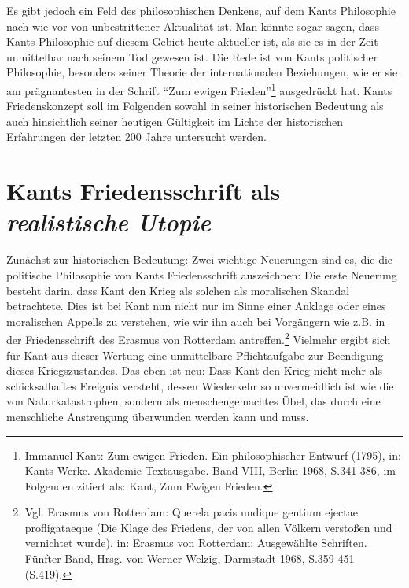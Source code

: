 \documentclass[12pt,a4paper,ngerman]{article}
\begin{document}
Es gibt jedoch ein Feld des philosophischen Denkens, auf dem Kants
Philosophie nach wie vor von unbestrittener Aktualität ist. Man könnte
sogar sagen, dass Kants Philosophie auf diesem Gebiet heute aktueller
ist, als sie es in der Zeit unmittelbar nach seinem Tod gewesen
ist. Die Rede ist von Kants politischer Philosophie, besonders seiner
Theorie der internationalen Beziehungen, wie er sie am prägnantesten
in der Schrift "`Zum ewigen Frieden"'\footnote{Immanuel Kant: Zum
ewigen Frieden. Ein philosophischer Entwurf (1795), in: Kants
Werke. Akademie-Textausgabe. Band VIII, Berlin 1968,
S.341-386, im Folgenden zitiert als: Kant, Zum Ewigen Frieden.}
ausgedrückt hat. Kants Friedenskonzept soll im Folgenden sowohl in
seiner historischen Bedeutung als auch hinsichtlich seiner heutigen
Gültigkeit im Lichte der historischen Erfahrungen der letzten 200
Jahre untersucht werden.

\section{Kants Friedensschrift als {\em realistische Utopie}}

Zunächst zur historischen Bedeutung: Zwei wichtige Neuerungen sind es,
die die politische Philosophie von Kants Friedensschrift auszeichnen:
Die erste Neuerung besteht darin, dass Kant den Krieg als solchen als
moralischen Skandal betrachtete. Dies ist bei Kant nun nicht nur im
Sinne einer Anklage oder eines moralischen Appells zu verstehen, wie
wir ihn auch bei Vorgängern wie z.B. in der Friedensschrift des
Erasmus von Rotterdam antreffen.\footnote{Vgl. Erasmus von Rotterdam:
  Querela pacis undique gentium ejectae profligataeque (Die Klage des
  Friedens, der von allen Völkern verstoßen und vernichtet wurde), in:
  Erasmus von Rotterdam: Ausgewählte Schriften. Fünfter Band, Hrsg.
  von Werner Welzig, Darmstadt 1968, S.359-451 (S.419).} Vielmehr
ergibt sich für Kant aus dieser Wertung eine unmittelbare
Pflichtaufgabe zur Beendigung dieses Kriegszustandes.  Das eben ist
neu: Dass Kant den Krieg nicht mehr als schicksalhaftes Ereignis
versteht, dessen Wiederkehr so unvermeidlich ist wie die von
Naturkatastrophen, sondern als menschengemachtes Übel, das durch eine
menschliche Anstrengung überwunden werden kann und muss.
\end{document}

